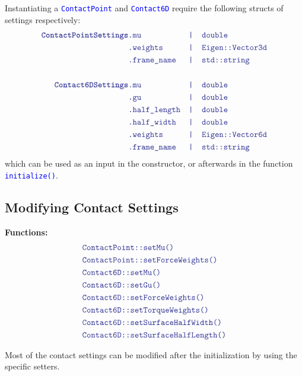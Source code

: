 \documentclass[12pt]{article}
\newcommand{\code}[2][Blue]{\textcolor{#1}{\texttt{#2}}}
\newcommand{\codebf}[2][Blue]{\textcolor{#1}{\texttt{\textbf{#2}}}}
\begin{document}
Instantiating a \code{ContactPoint} and \code{Contact6D} require the following structs of settings respectively:
%
\begin{align*}
    \codebf{ContactPointSettings}&\code{.mu} &&\code{|\quad double} \\
         &\code{.weights} &&\code{|\quad Eigen::Vector3d} \\
         &\code{.frame\_name} &&\code{|\quad std::string} \\
         \\
    \codebf{Contact6DSettings}&\code{.mu} &&\code{|\quad double} \\
    &\code{.gu} &&\code{|\quad double} \\
    &\code{.half\_length} && \code{|\quad double} \\
    &\code{.half\_width} && \code{|\quad double} \\
         &\code{.weights} &&\code{|\quad Eigen::Vector6d} \\
         &\code{.frame\_name} &&\code{|\quad std::string}
\end{align*}
which can be used as an input in the constructor, or afterwards in the function \code{initialize()}.


\clearpage

\subsection{Modifying Contact Settings}
\hrulefill

{\bf Functions:}
    \begin{align*}
        &\code{ContactPoint::setMu()}\\
        &\code{ContactPoint::setForceWeights()}\\
        &\code{Contact6D::setMu()}\\
        &\code{Contact6D::setGu()}\\
        &\code{Contact6D::setForceWeights()}\\
        &\code{Contact6D::setTorqueWeights()}\\
        &\code{Contact6D::setSurfaceHalfWidth()}\\
        &\code{Contact6D::setSurfaceHalfLength()}\\
    \end{align*}


Most of the contact settings can be modified after the initialization by using the specific setters.


\clearpage
\end{document}
